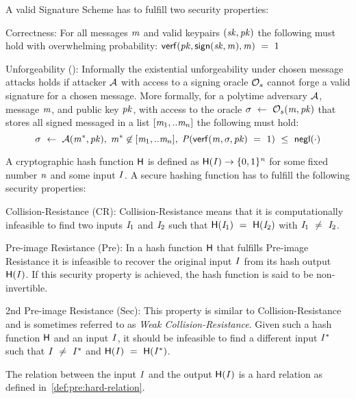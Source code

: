 \begin{definition}
    A valid Signature Scheme has to fulfill two security properties:
    \begin{asparaitem}
        \item Correctness: For all messages $\mathit{m}$ and valid keypairs $(\mathit{sk}, \mathit{pk})$ the following must hold with overwhelming probability: $\mathsf{verf}(\mathit{pk}, \mathsf{sign}(\mathit{sk}, \mathit{m}), \mathit{m}) ~=~ 1$
        \item Unforgeability (\cnstEUFCMA): Informally the existential unforgeability under chosen message attacks holds if attacker $\mathcal{A}$ with access to a signing oracle $\mathcal{O}_{s}$ cannot forge a valid signature for a chosen message.
        More formally, for a polytime adversary $\mathcal{A}$, message $\mathit{m}$, and public key $\mathit{pk}$, with access to the oracle $\sigma ~\leftarrow~ \mathcal{O}_{s}(\mathit{m},\mathit{pk})$ that stores all signed messaged in a list $[\mathit{m}_1,..\mathit{m}_n]$ the following must hold:
        \[ \sigma ~\leftarrow~ \mathcal{A}(\mathit{m}^*, \mathit{pk}), \; \mathit{m}^* \not\in [\mathit{m}_1,..\mathit{m}_n], \; \mathit{P}(\mathsf{verf}(\mathit{m}, \sigma, \mathit{pk}) ~=~ 1) ~\leq~ \mathsf{negl}(\cdot) \]
    \end{asparaitem}
\end{definition}

\begin{definition}\label{def:pre:hash-function}
    A cryptographic hash function $\mathsf{H}$ is defined as $\mathsf{H} (\mathit{I}) \rightarrow \{0,1\}^{\mathit{n}}$ for some fixed number $\mathit{n}$ and some input $\mathit{I}$.
    A secure hashing function has to fulfill the following security properties:
    \begin{asparaitem}
        \item Collision-Resistance (CR): Collision-Resistance means that it is computationally infeasible to find two inputs $\mathit{I}_1$ and $\mathit{I}_2$ such that
        $\mathsf{H} (\mathit{I}_1) ~=~ \mathsf{H} (\mathit{I}_2)$ with $\mathit{I}_1 ~\neq~ \mathit{I}_2$.
        \item Pre-image Resistance (Pre): In a hash function $\mathsf{H}$ that fulfills Pre-image Resistance it is infeasible to recover the original input $\mathit{I}$ from its hash output $\mathsf{H} (\mathit{I})$.
        If this security property is achieved, the hash function is said to be non-invertible.
        \item 2nd Pre-image Resistance (Sec):  This property is similar to Collision-Resistance and is sometimes referred to as \textit{Weak Collision-Resistance}.
        Given such a hash function $\mathsf{H}$ and an input $\mathit{I}$, it should be infeasible to find a different input $\mathit{I}^*$ such that $\mathit{I} ~\neq~ \mathit{I}^*$
        and $\mathsf{H} (\mathit{I}) ~=~ \mathsf{H} (\mathit{I}^*)$.
    \end{asparaitem}
    The relation between the input $\mathit{I}$ and the output $\mathsf{H} (\mathit{I})$ is a hard relation as defined in~\cref{def:pre:hard-relation}.
\end{definition}

